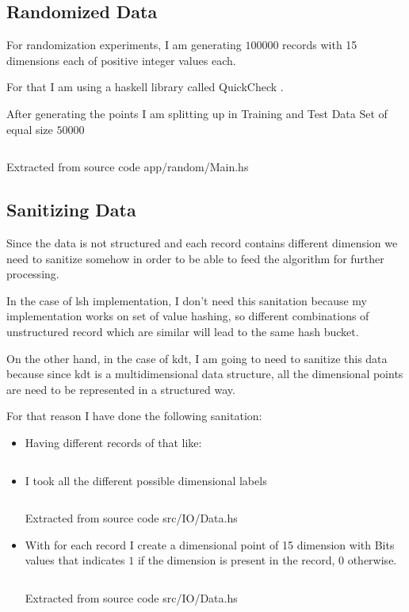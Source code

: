 \documentclass[12pt, a4paper]{article}
\begin{document}
\subsection{Randomized Data}\label{sub:sec:random:data}
For randomization experiments, I am generating $100000$ records with 15 dimensions each of positive integer values each.

For that I am using a \acrshort{haskell} library called QuickCheck \cite{QuickCheck}.

After generating the points I am splitting up in Training and Test Data Set of equal size $50000$

   \begin{listing}[H]
    \inputminted[firstline=11, lastline=15]{haskell}{../app/random/Main.hs}
    \caption{Extracted from source code app/random/Main.hs}
    \label{src:main:random}
   \end{listing}



\subsection{Sanitizing Data}
Since the data is not structured and each record contains different dimension we need to sanitize somehow in order to be able to feed the algorithm for further processing.

In the case of \acrshort{lsh} implementation, I don't need this sanitation because my implementation works on set of value hashing, so different combinations of unstructured record which are similar will lead to the same hash bucket.

On the other hand, in the case of \acrshort{kdt}, I am going to need to sanitize this data because since \acrshort{kdt} is a multidimensional data structure, all the dimensional points are need to be represented in a structured way.

For that reason I have done the following sanitation:

\begin{itemize}
  \item Having different records of that like:

    \inputminted[firstline=2, lastline=12]{text}{../input/data.in}

  \item I took all the different possible dimensional labels
    \begin{listing}[H]
    \inputminted[firstline=91, lastline=108]{haskell}{../src/IO/Data.hs}
    \caption{Extracted from source code src/IO/Data.hs}
    \label{src:io:data:1}
    \end{listing}

  \item With for each record I create a dimensional point of 15 dimension with Bits values that indicates $1$ if the dimension is present in the record, $0$ otherwise.
    \begin{listing}[H]
    \inputminted[firstline=72, lastline=82]{haskell}{../src/IO/Data.hs}
    \caption{Extracted from source code src/IO/Data.hs}
    \label{src:io:data:2}
    \end{listing}

\end{itemize}
\end{document}

